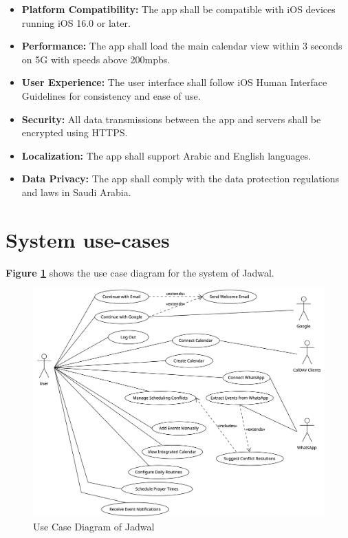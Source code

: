 \documentclass[12pt,a4paper]{report}
\begin{document}
\begin{itemize}
    \item \textbf{Platform Compatibility:} The app shall be compatible with iOS devices running iOS 16.0 or later.
    \item \textbf{Performance:} The app shall load the main calendar view within 3 seconds on 5G with speeds above 200mpbs.
    \item \textbf{User Experience:} The user interface shall follow iOS Human Interface Guidelines for consistency and ease of use.
    \item \textbf{Security:} All data transmissions between the app and servers shall be encrypted using HTTPS.
    \item \textbf{Localization:} The app shall support Arabic and English languages.
    \item \textbf{Data Privacy:} The app shall comply with the data protection regulations and laws in Saudi Arabia.
\end{itemize}

\section{System use-cases}

\textbf{Figure \ref{fig:use-case-diagram}} shows the use case diagram for the system of Jadwal.

\begin{figure}[!h]
    \centering
    \includegraphics[width=\textwidth]{images/use-case-diagram.png}
    \caption{Use Case Diagram of Jadwal}
    \label{fig:use-case-diagram}
\end{figure}
\end{document}
